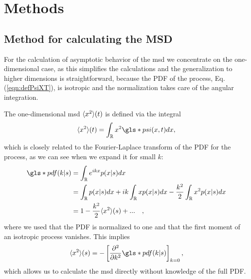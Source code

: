 \chapter{Methods}

\section{Method for calculating the MSD} 

For the calculation of asymptotic behavior of the \gls*{msd} we concentrate on the one-dimensional case, as this simplifies the calculations and the generalization to higher dimensions is straightforward, because the \gls*{PDF} of the process, Eq. (\ref{eqn:defPsiXT}), is isotropic and the normalization takes care of the angular integration. 

The one-dimensional \gls*{msd} $\langle x^2 \rangle(t)$ is defined via the integral 
%
\begin{align}
\mean{x^2}(t) = \int_{\mathbb{R}} x^2 \gls*{psi}(x,t) dx ,
\end{align}
%
which is closely related to the Fourier-Laplace transform of the \gls*{PDF} for the process, as we can see when we expand it for small $k$:
%
\begin{align}
\gls*{pdf}(k|s) &= \int_{\mathbb{R}}  e^{ik x} p(x|s) dx  \\
&= \int_{\mathbb{R}}   p(x|s) dx +  i k \int_{\mathbb{R}}   x p(x|s) dx - \frac{k^2}{2} \int_{\mathbb{R}}   x^2 p(x|s) dx \\
&= 1 - \frac{k^2}{2} \mean{x^2}(s)  + ... \quad ,
\end{align}
%
where we used that the \gls*{PDF} is normalized to one and that the first moment of an isotropic process vanishes. This implies 
%
\begin{align}
\mean{x^2}(s) = - \left[ \npder{}{k}{2} \gls*{pdf}(k|s) \right]_{k=0} \label{eqn:MSDDerivative}, 
\end{align}
%
which allows us to calculate the \gls*{msd} directly without knowledge of the full \gls*{PDF}.

